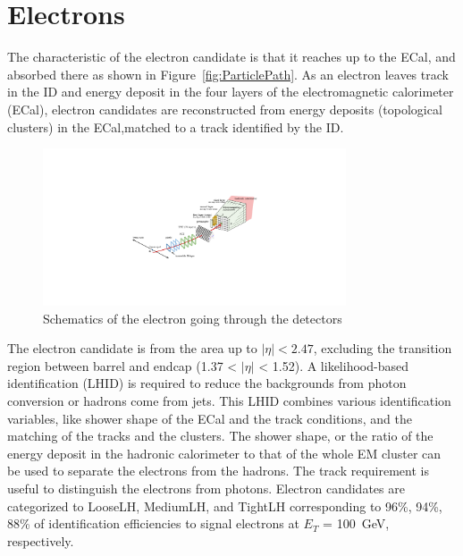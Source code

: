\section{Electrons}
The characteristic of the electron candidate is that it reaches up to the ECal, and absorbed there as shown in Figure~\ref{fig:ParticlePath}. As an electron leaves track in the ID and energy deposit in the four layers of the electromagnetic calorimeter (ECal), electron candidates are reconstructed from energy deposits (topological clusters) in the ECal,matched to a track identified by the ID.
\begin{figure}[tbp]
\begin{center}
 \includegraphics[width=0.80\textwidth,keepaspectratio]{figures/Reconstruction/electronPath}
\caption{
Schematics of the electron going through the detectors
}
\label{fig:electronPath}
\end{center}
\end{figure}

The electron candidate is from the area up to $|\eta|<2.47$, excluding the transition region between barrel and endcap (1.37 < $|\eta|$ < 1.52).
A likelihood-based identification (LHID) is required to reduce the backgrounds from photon conversion or hadrons come from jets. This LHID combines various identification variables, like shower shape of the ECal and the track conditions, and the matching of the tracks and the clusters. The shower shape, or the ratio of the energy deposit in the hadronic calorimeter to that of the whole EM cluster can be used to separate the electrons from the hadrons. The track requirement is useful to distinguish the electrons from photons. Electron candidates are categorized to LooseLH, MediumLH, and TightLH corresponding to 96\%, 94\%, 88\% of identification efficiencies to signal electrons at $E_T$ = 100~GeV, respectively.

